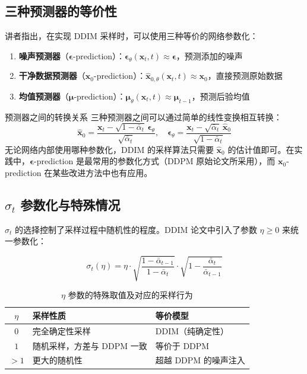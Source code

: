 \documentclass[a4paper]{article}
\begin{document}
\subsection{三种预测器的等价性}

讲者指出，在实现 DDIM 采样时，可以使用三种等价的网络参数化：

\begin{enumerate}
    \item \textbf{噪声预测器}（$\boldsymbol{\epsilon}$-prediction）：$\boldsymbol{\epsilon}_\theta(\mathbf{x}_t, t) \approx \boldsymbol{\epsilon}$，预测添加的噪声
    \item \textbf{干净数据预测器}（$\mathbf{x}_0$-prediction）：$\hat{\mathbf{x}}_{0,\theta}(\mathbf{x}_t, t) \approx \mathbf{x}_0$，直接预测原始数据
    \item \textbf{均值预测器}（$\boldsymbol{\mu}$-prediction）：$\boldsymbol{\mu}_\theta(\mathbf{x}_t, t) \approx \boldsymbol{\mu}_{t-1}$，预测后验均值
\end{enumerate}

\begin{knowledgebox}{预测器之间的转换关系}
三种预测器之间可以通过简单的线性变换相互转换：
$$
\hat{\mathbf{x}}_0 = \frac{\mathbf{x}_t - \sqrt{1-\bar{\alpha}_t}\,\boldsymbol{\epsilon}_\theta}{\sqrt{\bar{\alpha}_t}}, \quad
\boldsymbol{\epsilon}_\theta = \frac{\mathbf{x}_t - \sqrt{\bar{\alpha}_t}\,\hat{\mathbf{x}}_0}{\sqrt{1-\bar{\alpha}_t}}
$$
无论网络内部使用哪种参数化，DDIM 的采样算法只需要 $\hat{\mathbf{x}}_0$ 的估计值即可。在实践中，$\boldsymbol{\epsilon}$-prediction 是最常用的参数化方式（DDPM 原始论文所采用），而 $\mathbf{x}_0$-prediction 在某些改进方法中也有应用。
\end{knowledgebox}

\subsection{$\sigma_t$ 参数化与特殊情况}

$\sigma_t$ 的选择控制了采样过程中随机性的程度。DDIM 论文中引入了参数 $\eta \geq 0$ 来统一参数化：

$$
\sigma_t(\eta) = \eta \cdot \sqrt{\frac{1-\bar{\alpha}_{t-1}}{1-\bar{\alpha}_t}} \cdot \sqrt{1 - \frac{\bar{\alpha}_t}{\bar{\alpha}_{t-1}}}
$$

\begin{table}[H]
\centering
\caption{$\eta$ 参数的特殊取值及对应的采样行为}
\begin{tabular}{cll}
\toprule
$\eta$ & \textbf{采样性质} & \textbf{等价模型} \\
\midrule
$0$ & 完全确定性采样 & DDIM（纯确定性） \\
$1$ & 随机采样，方差与 DDPM 一致 & 等价于 DDPM \\
$>1$ & 更大的随机性 & 超越 DDPM 的噪声注入 \\
\bottomrule
\end{tabular}
\end{table}
\end{document}
